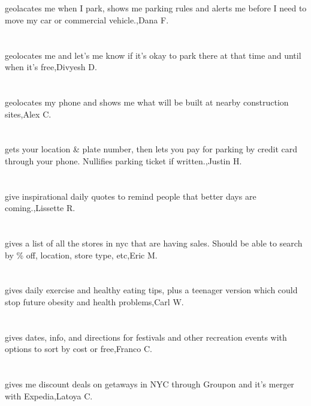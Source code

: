 \section{}geolacates me when I park, shows me parking rules and alerts me before I need to move my car or commercial vehicle.,Dana F.
\section{}geolocates me and let's me know if it's okay to park there at that time and until when it's free,Divyesh D.
\section{}geolocates my phone and shows me what will be built at nearby construction sites,Alex C.
\section{}gets your location \& plate number, then lets you pay for parking by credit card through your phone. Nullifies parking ticket if written.,Justin H.
\section{}give inspirational daily quotes to remind people that better days are coming.,Lissette R.
\section{} gives a list of all the stores in nyc that are having sales.  Should be able to search by \% off, location, store type, etc,Eric M.
\section{}gives daily exercise and healthy eating tips, plus a teenager version which could stop future obesity and health problems,Carl W.
\section{}gives dates, info, and directions for festivals and other recreation events with options to sort by cost or free,Franco C.
\section{}gives me discount deals on getaways  in NYC through Groupon and it's merger with Expedia,Latoya C.
